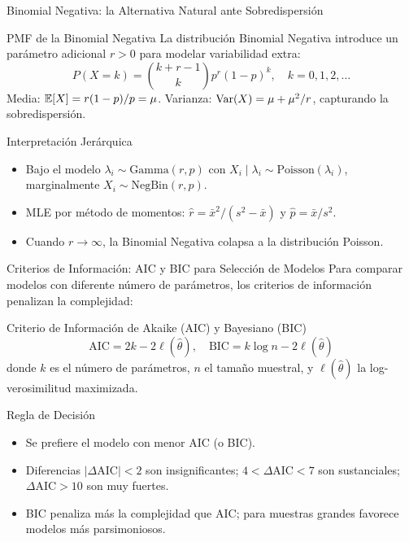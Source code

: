 \documentclass[10pt, aspectratio=169]{beamer}
\begin{document}
\begin{frame}{Binomial Negativa: la Alternativa Natural ante Sobredispersión}
  \vspace{-0.15cm}
  \begin{block}{PMF de la Binomial Negativa}
    \footnotesize
    La distribución Binomial Negativa introduce un parámetro adicional $r > 0$ para modelar variabilidad extra:
    $$P(X = k) = \binom{k + r - 1}{k} p^{r} (1-p)^{k}, \quad k = 0, 1, 2, \dots$$
    Media: $\mathbb{E}[X] = r(1-p)/p = \mu$. Varianza: $\operatorname{Var}(X) = \mu + \mu^{2}/r$, capturando la sobredispersión.
  \end{block}

  \vspace{0.1cm}
  \pause
  \begin{alertblock}{Interpretación Jerárquica}
    \footnotesize
    \begin{itemize}\itemsep=0.03cm
      \item Bajo el modelo $\lambda_{i} \sim \text{Gamma}(r, p)$ con $X_{i} \mid \lambda_{i} \sim \text{Poisson}(\lambda_{i})$, marginalmente $X_{i} \sim \text{NegBin}(r, p)$.
      \item MLE por método de momentos: $\hat{r} = \bar{x}^{2}/(s^{2} - \bar{x})$ y $\hat{p} = \bar{x}/s^{2}$.
      \item Cuando $r \to \infty$, la Binomial Negativa colapsa a la distribución Poisson.
    \end{itemize}
  \end{alertblock}
\end{frame}

\begin{frame}{Criterios de Información: AIC y BIC para Selección de Modelos}
  \footnotesize
  Para comparar modelos con diferente número de parámetros, los criterios de información penalizan la complejidad: \pause

  \vspace{0.1cm}
  \begin{block}{Criterio de Información de Akaike (AIC) y Bayesiano (BIC)}
    $$\text{AIC} = 2k - 2\ell(\hat{\theta}), \quad \text{BIC} = k \log n - 2\ell(\hat{\theta})$$
    donde $k$ es el número de parámetros, $n$ el tamaño muestral, y $\ell(\hat{\theta})$ la log-verosimilitud maximizada.
  \end{block}

  \vspace{0.1cm}
  \pause
  \begin{alertblock}{Regla de Decisión}
    \begin{itemize}\itemsep=0.05cm
      \item Se prefiere el modelo con menor AIC (o BIC).
      \item Diferencias $|\Delta\text{AIC}| < 2$ son insignificantes; $4 < \Delta\text{AIC} < 7$ son sustanciales; $\Delta\text{AIC} > 10$ son muy fuertes.
      \item BIC penaliza más la complejidad que AIC; para muestras grandes favorece modelos más parsimoniosos.
    \end{itemize}
  \end{alertblock}
\end{frame}
\end{document}
